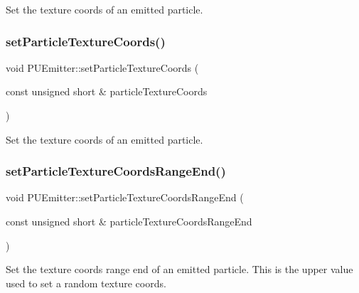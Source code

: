 Set the texture coords of an emitted particle. \mbox{\label{classPUEmitter_a400b39eba5fa388728c51eda60b11163}} 
\subsubsection{\texorpdfstring{set\+Particle\+Texture\+Coords()}{setParticleTextureCoords()}\hspace{0.1cm}{\footnotesize\ttfamily [2/2]}}
{\footnotesize\ttfamily void P\+U\+Emitter\+::set\+Particle\+Texture\+Coords (\begin{DoxyParamCaption}\item[{const unsigned short \&}]{particle\+Texture\+Coords }\end{DoxyParamCaption})}

Set the texture coords of an emitted particle. \mbox{\label{classPUEmitter_adedd188e230448e37af079e08833d23e}} 
\subsubsection{\texorpdfstring{set\+Particle\+Texture\+Coords\+Range\+End()}{setParticleTextureCoordsRangeEnd()}\hspace{0.1cm}{\footnotesize\ttfamily [1/2]}}
{\footnotesize\ttfamily void P\+U\+Emitter\+::set\+Particle\+Texture\+Coords\+Range\+End (\begin{DoxyParamCaption}\item[{const unsigned short \&}]{particle\+Texture\+Coords\+Range\+End }\end{DoxyParamCaption})}

Set the texture coords range end of an emitted particle. This is the upper value used to set a random texture coords. \mbox{\label{classPUEmitter_adedd188e230448e37af079e08833d23e}} 
